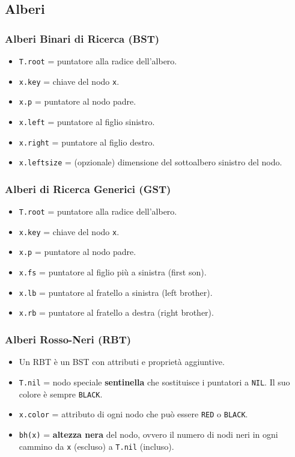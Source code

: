 \subsection{Alberi}

\subsubsection{Alberi Binari di Ricerca (BST)}
\begin{itemize}
    \item \texttt{T.root} = puntatore alla radice dell'albero.
    \item \texttt{x.key} = chiave del nodo \texttt{x}.
    \item \texttt{x.p} = puntatore al nodo padre.
    \item \texttt{x.left} = puntatore al figlio sinistro.
    \item \texttt{x.right} = puntatore al figlio destro.
    \item \texttt{x.leftsize} = (opzionale) dimensione del sottoalbero sinistro del nodo.
\end{itemize}


\subsubsection{Alberi di Ricerca Generici (GST)}
\begin{itemize}
    \item \texttt{T.root} = puntatore alla radice dell'albero.
    \item \texttt{x.key} = chiave del nodo \texttt{x}.
    \item \texttt{x.p} = puntatore al nodo padre.
    \item \texttt{x.fs} = puntatore al figlio più a sinistra (first son).
    \item \texttt{x.lb} = puntatore al fratello a sinistra (left brother).
    \item \texttt{x.rb} = puntatore al fratello a destra (right brother).
\end{itemize}

\subsubsection{Alberi Rosso-Neri (RBT)}
\begin{itemize}
    \item Un RBT è un BST con attributi e proprietà aggiuntive.
    \item \texttt{T.nil} = nodo speciale \textbf{sentinella} che sostituisce i puntatori a \texttt{NIL}. Il suo colore è sempre \texttt{BLACK}.
    \item \texttt{x.color} = attributo di ogni nodo che può essere \texttt{RED} o \texttt{BLACK}.
    \item \texttt{bh(x)} = \textbf{altezza nera} del nodo, ovvero il numero di nodi neri in ogni cammino da \texttt{x} (escluso) a \texttt{T.nil} (incluso).
\end{itemize}

